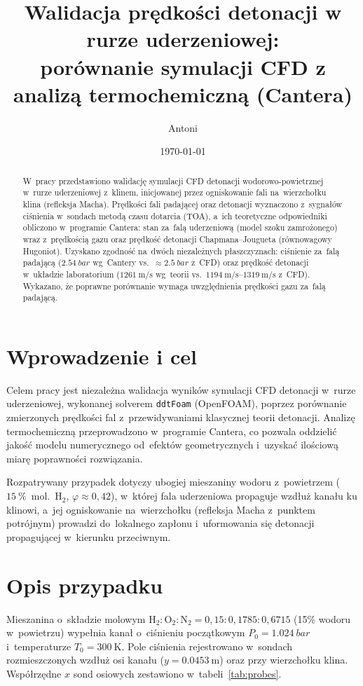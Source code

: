 \documentclass[11pt,a4paper]{article}
\title{\vspace{-1.5em}Walidacja prędkości detonacji w rurze uderzeniowej:\\
porównanie symulacji CFD z analizą termochemiczną (Cantera)}
\author{Antoni}
\date{\today}
\begin{document}
\maketitle

\begin{abstract}
\noindent
W~pracy przedstawiono walidację symulacji CFD detonacji wodorowo-powietrznej
w~rurze uderzeniowej z~klinem, inicjowanej przez ogniskowanie fali na~wierzchołku
klina (refleksja Macha). Prędkości fali padającej oraz detonacji wyznaczono
z~sygnałów ciśnienia w~sondach metodą czasu dotarcia (TOA), a~ich teoretyczne
odpowiedniki obliczono w~programie Cantera: stan za~falą uderzeniową
(model szoku zamrożonego) wraz z~prędkością gazu oraz prędkość detonacji
Chapmana--Jougueta (równowagowy Hugoniot). Uzyskano zgodność na~dwóch
niezależnych płaszczyznach: ciśnienie za~falą padającą ($\SI{2,54}{bar}$ wg~Cantery
vs.~$\approx\SI{2,5}{bar}$ z~CFD) oraz prędkość detonacji w~układzie laboratorium
($\SI{1261}{\meter\per\second}$ wg~teorii vs.~$\SIrange{1194}{1319}{\meter\per\second}$
z~CFD). Wykazano, że poprawne porównanie wymaga uwzględnienia prędkości gazu
za~falą padającą.
\end{abstract}

\section{Wprowadzenie i cel}
Celem pracy jest niezależna walidacja wyników symulacji CFD detonacji
w~rurze uderzeniowej, wykonanej solverem \texttt{ddtFoam} (OpenFOAM), poprzez
porównanie zmierzonych prędkości fal z~przewidywaniami klasycznej teorii
detonacji. Analizę termochemiczną przeprowadzono w~programie Cantera, co
pozwala oddzielić jakość modelu numerycznego od~efektów geometrycznych
i~uzyskać ilościową miarę poprawności rozwiązania.

Rozpatrywany przypadek dotyczy ubogiej mieszaniny wodoru z~powietrzem
($\SI{15}{\percent}$~mol.~$\mathrm{H_2}$, $\varphi\approx0{,}42$), w~której
fala uderzeniowa propaguje wzdłuż kanału ku klinowi, a~jej ogniskowanie
na~wierzchołku (refleksja Macha z~punktem potrójnym) prowadzi do~lokalnego
zapłonu i~uformowania się detonacji propagującej w~kierunku przeciwnym.

\section{Opis przypadku}
Mieszanina o~składzie molowym $\mathrm{H_2}:\mathrm{O_2}:\mathrm{N_2}
=0{,}15:0{,}1785:0{,}6715$ (15\% wodoru w~powietrzu) wypełnia kanał
o~ciśnieniu początkowym $P_0=\SI{1,024}{bar}$ i~temperaturze
$T_0=\SI{300}{\kelvin}$. Pole ciśnienia rejestrowano w~sondach
rozmieszczonych wzdłuż osi kanału ($y=\SI{0,0453}{\meter}$) oraz przy
wierzchołku klina. Współrzędne $x$ sond osiowych zestawiono
w~tabeli~\ref{tab:probes}.
\end{document}
